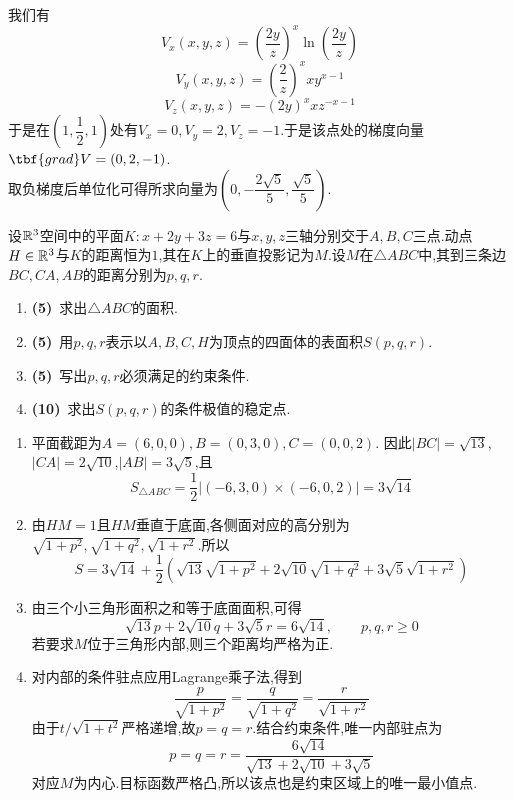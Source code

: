 \documentclass{ctexart}
\begin{document}
\begin{solution}
我们有
    \[V_x(x,y,z)=\left(\dfrac{2y}{z}\right)^x\ln\left(\dfrac{2y}{z}\right)\]
    \[V_y(x,y,z)=\left(\dfrac2z\right)^xxy^{x-1}\]
    \[V_z(x,y,z)=-(2y)^xxz^{-x-1}\]
    于是在$\left(1,\dfrac12,1\right)$处有$V_x=0,V_y=2,V_z=-1$.于是该点处的梯度向量$\tbf{grad}V=(0,2,-1)$.\\
    取负梯度后单位化可得所求向量为$\left(0,-\dfrac{2\sqrt5}{5},\dfrac{\sqrt5}{5}\right)$.
\end{solution}
\begin{problem}[6.(25\songti{分})]
设$\mathbb{R}^3$空间中的平面$K:x+2y+3z=6$与$x,y,z$三轴分别交于$A,B,C$三点.动点$H\in\mathbb{R}^3$与$K$的距离恒为$1$,其在$K$上的垂直投影记为$M$.设$M$在$\triangle ABC$中,其到三条边$BC,CA,AB$的距离分别为$p,q,r$.
            \begin{enumerate}[label=\textbf{(\arabic*)},leftmargin=*]
                \item \textbf{(5)}\ 求出$\triangle ABC$的面积.
                \item \textbf{(5)}\ 用$p,q,r$表示以$A,B,C,H$为顶点的四面体的表面积$S(p,q,r)$.
                \item \textbf{(5)}\ 写出$p,q,r$必须满足的约束条件.
                \item \textbf{(10)}\ 求出$S(p,q,r)$的条件极值的稳定点.
            \end{enumerate}
\end{problem}
\begin{solution}
\begin{enumerate}[label=\tbf{(\arabic*)},leftmargin=*]
\item 平面截距为$A=(6,0,0),B=(0,3,0),C=(0,0,2)$.
因此$|BC|=\sqrt{13}$,$|CA|=2\sqrt{10}$,$|AB|=3\sqrt5$,且
\[S_{\triangle ABC}=\dfrac12|(-6,3,0)\times(-6,0,2)|=3\sqrt{14}\]
\item 由$HM=1$且$HM$垂直于底面,各侧面对应的高分别为$\sqrt{1+p^2},\sqrt{1+q^2},\sqrt{1+r^2}$.所以
\[S=3\sqrt{14}+\dfrac12\left(\sqrt{13}\sqrt{1+p^2}
+2\sqrt{10}\sqrt{1+q^2}+3\sqrt5\sqrt{1+r^2}\right)\]
\item 由三个小三角形面积之和等于底面面积,可得
\[\sqrt{13}p+2\sqrt{10}q+3\sqrt5r=6\sqrt{14},\qquad p,q,r\geqslant0\]
若要求$M$位于三角形内部,则三个距离均严格为正.
\item 对内部的条件驻点应用Lagrange乘子法,得到
\[\dfrac{p}{\sqrt{1+p^2}}=\dfrac{q}{\sqrt{1+q^2}}=\dfrac{r}{\sqrt{1+r^2}}\]
由于$t/\sqrt{1+t^2}$严格递增,故$p=q=r$.结合约束条件,唯一内部驻点为
\[p=q=r=\dfrac{6\sqrt{14}}{\sqrt{13}+2\sqrt{10}+3\sqrt5}\]
对应$M$为内心.目标函数严格凸,所以该点也是约束区域上的唯一最小值点.
\end{enumerate}
\end{solution}
\end{document}
